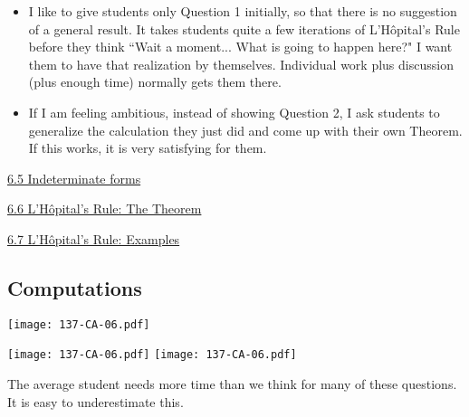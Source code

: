 \documentclass[11pt]{article}
\newcommand{\nl}{\hfill \vspace{-1.1\baselineskip}} %
\newcommand{\vv}{\hspace{8mm} \href{https://www.youtube.com/watch?v=yz8uZbi2wEk&list=PLlwePzQY_wW9EsqbQzPdJTNGsHYvO_2CJ&index=5}{6.5 Indeterminate forms}}
\newcommand{\vvi}{\hspace{8mm} \href{https://www.youtube.com/watch?v=6YvN79aDbjs&list=PLlwePzQY_wW9EsqbQzPdJTNGsHYvO_2CJ&index=6}{6.6 L'Hôpital's Rule: The Theorem}}
\newcommand{\vvii}{\hspace{8mm} \href{https://www.youtube.com/watch?v=aaee9hSP7Gw&list=PLlwePzQY_wW9EsqbQzPdJTNGsHYvO_2CJ&index=7}{6.7 L'Hôpital's Rule: Examples}}
\begin{document}
\begin{comments}
\nl
	\begin{itemize}
		\item I like to give students only Question 1 initially, so that there is no suggestion of a general result.  It takes students quite a few iterations of L'H\^{o}pital's Rule before they think ``Wait a moment... What is going to happen here?"  I want them to have that realization by themselves.  Individual work plus discussion (plus enough time) normally gets them there.
		
		\item If I am feeling ambitious, instead of showing Question 2, I ask students to generalize the calculation they just did and come up with their own Theorem. 		If this works, it is very satisfying for them.
	\end{itemize}
\end{comments}

\begin{videos}
\vv

\vvi

\vvii
\end{videos}

\newpage
\subsection{Computations}

\begin{center}
{ \texttt{[image: 137-CA-06.pdf]}} 

{ \texttt{[image: 137-CA-06.pdf]}} \quad
{ \texttt{[image: 137-CA-06.pdf]}} 
\end{center}

\begin{warning}
The average student needs more time than we think for many of these questions.  It is easy to underestimate this.
\end{warning}
\end{document}

